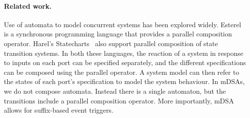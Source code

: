 
  

  


\paragraph*{Related work.}
Use of automata to model concurrent systems has been explored widely.
Esterel~\cite{DBLP:journals/scp/BerryG92} is a synchronous programming language
that provides a parallel composition operator. Harel's
Statecharts~\cite{DBLP:journals/scp/Harel87} also support parallel composition
of state transition systems. In both these languages, the reaction of a system
in response to inputs on each port can be specified separately, and the
different specifications can be composed using the parallel operator. A system
model can then refer to the states of each port's specification to model the
system behaviour. In mDSAs, we do not compose automata. Instead there is a single automaton, but the transitions include a parallel composition operator. More importantly, mDSA allows for suffix-based event triggers. %

